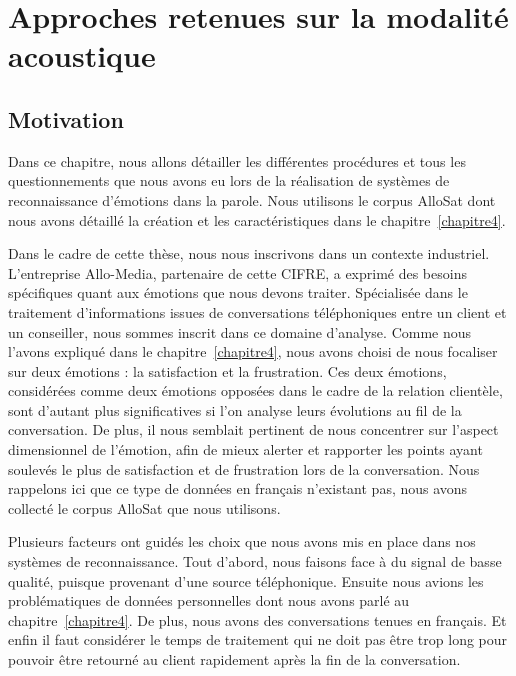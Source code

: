 \chapter{Approches retenues sur la modalité acoustique}
\label{chapitre5}

\section{Motivation}
Dans ce chapitre, nous allons détailler les différentes procédures et tous les questionnements que nous avons eu lors de la réalisation de systèmes de reconnaissance d'émotions dans la parole. Nous utilisons le corpus AlloSat dont nous avons détaillé la création et les caractéristiques dans le chapitre~\ref{chapitre4}.

Dans le cadre de cette thèse, nous nous inscrivons dans un contexte industriel. L'entreprise Allo-Media, partenaire de cette CIFRE, a exprimé des besoins spécifiques quant aux émotions que nous devons traiter. Spécialisée dans le traitement d'informations issues de conversations téléphoniques entre un client et un conseiller, nous sommes inscrit dans ce domaine d'analyse. Comme nous l'avons expliqué dans le chapitre~\ref{chapitre4}, nous avons choisi de nous focaliser sur deux émotions : la satisfaction et la frustration. Ces deux émotions, considérées comme deux émotions opposées dans le cadre de la relation clientèle, sont d'autant plus significatives si l'on analyse leurs évolutions au fil de la conversation. De plus, il nous semblait pertinent de nous concentrer sur l'aspect dimensionnel de l'émotion, afin de mieux alerter et rapporter les points ayant soulevés le plus de satisfaction et de frustration lors de la conversation. Nous rappelons ici que ce type de données en français n'existant pas, nous avons collecté le corpus AlloSat que nous utilisons.

Plusieurs facteurs ont guidés les choix que nous avons mis en place dans nos systèmes de reconnaissance. Tout d'abord, nous faisons face à du signal de basse qualité, puisque provenant d'une source téléphonique. Ensuite nous avions les problématiques de données personnelles dont nous avons parlé au chapitre~\ref{chapitre4}. De plus, nous avons des conversations tenues en français. Et enfin il faut considérer le temps de traitement qui ne doit pas être trop long pour pouvoir être retourné au client rapidement après la fin de la conversation.

